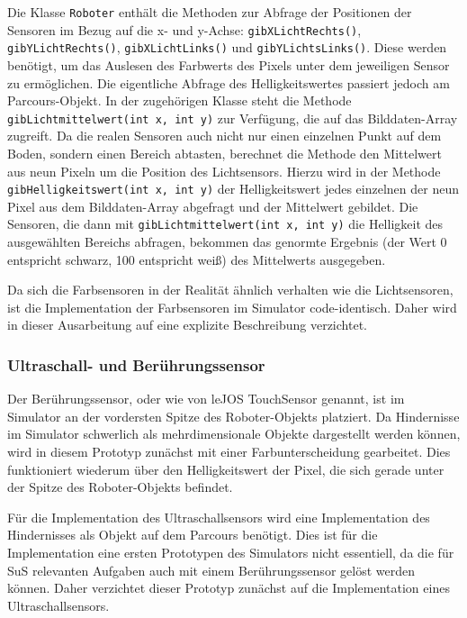 \documentclass[paper=a4, DIV=14, BCOR=15mm, twoside=on, onecolumn=on, open = right, titlepage =on, parskip =half, headsepline = on, footsepline = on, chapterprefix = on, appendixprefix = off, fontsize = 12pt, numbers = noenddot, abstract = on]{scrbook}
\begin{document}
Die Klasse \texttt{Roboter} enthält die Methoden zur Abfrage der Positionen der Sensoren im Bezug auf die x- und y-Achse: \texttt{gib\-X\-Licht\-Rechts()}, \texttt{gib\-Y\-Licht\-Rechts()}, \texttt{gib\-X\-Licht\-Links()} und \texttt{gibYLichtsLinks()}. Diese werden benötigt, um das Auslesen des Farbwerts des Pixels unter dem jeweiligen Sensor zu ermöglichen. Die eigentliche Abfrage des Helligkeitswertes passiert jedoch am Parcours-Objekt. In der zugehörigen Klasse steht die Methode \texttt{gibLichtmittelwert(int x, int y)} zur Verfügung, die auf das Bilddaten-Array zugreift. Da die realen Sensoren auch nicht nur einen einzelnen Punkt auf dem Boden, sondern einen Bereich abtasten, berechnet die Methode den Mittelwert aus neun Pixeln um die Position des Lichtsensors. Hierzu wird in der Methode \texttt{gib\-Hellig\-keits\-wert(int x, int y)} der Helligkeitswert jedes einzelnen der neun Pixel aus dem Bilddaten-Array abgefragt und der Mittelwert gebildet. Die Sensoren, die dann mit \texttt{gib\-Licht\-mittel\-wert(int x, int y)} die Helligkeit des ausgewählten Bereichs abfragen, bekommen das genormte Ergebnis (der Wert 0 entspricht schwarz, 100 entspricht weiß) des Mittelwerts ausgegeben.

Da sich die Farbsensoren in der Realität ähnlich verhalten wie die Lichtsensoren, ist die Implementation der Farbsensoren im Simulator code-identisch. Daher wird in dieser Ausarbeitung auf eine explizite Beschreibung verzichtet.

\subsubsection{Ultraschall- und Berührungssensor}
Der Berührungssensor, oder wie von leJOS TouchSensor genannt, ist im Simulator an der vordersten Spitze des Roboter-Objekts platziert. Da Hindernisse im Simulator schwerlich als mehrdimensionale Objekte dargestellt werden können, wird in diesem Prototyp zunächst mit einer Farbunterscheidung gearbeitet. Dies funktioniert wiederum über den Helligkeitswert der Pixel, die sich gerade unter der Spitze des Roboter-Objekts befindet.

Für die Implementation des Ultraschallsensors wird eine Implementation des Hindernisses als Objekt auf dem Parcours benötigt. Dies ist für die Implementation eine ersten Prototypen des Simulators nicht essentiell, da die für SuS relevanten Aufgaben auch mit einem Berührungssensor gelöst werden können. Daher verzichtet dieser Prototyp zunächst auf die Implementation eines Ultraschallsensors.
\end{document}
